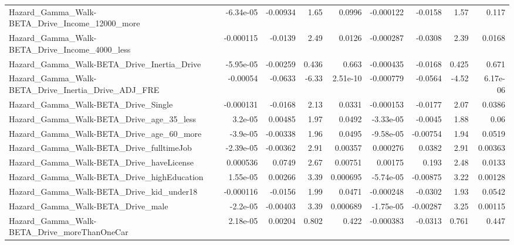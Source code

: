 \begin{tabular}{lrrrrrrrr}
Hazard\_Gamma\_Walk-BETA\_Drive\_Income\_12000\_more     &   -6.34e-05 &     -0.00934 &     1.65 &   0.0996 &  -0.000122 &     -0.0158 &         1.57 &         0.117 \\
Hazard\_Gamma\_Walk-BETA\_Drive\_Income\_4000\_less      &   -0.000115 &      -0.0139 &     2.49 &   0.0126 &  -0.000287 &     -0.0308 &         2.39 &        0.0168 \\
Hazard\_Gamma\_Walk-BETA\_Drive\_Inertia\_Drive         &   -5.95e-05 &     -0.00259 &    0.436 &    0.663 &  -0.000435 &     -0.0168 &        0.425 &         0.671 \\
Hazard\_Gamma\_Walk-BETA\_Drive\_Inertia\_Drive\_ADJ\_FRE &    -0.00054 &      -0.0633 &    -6.33 & 2.51e-10 &  -0.000779 &     -0.0564 &        -4.52 &      6.17e-06 \\
Hazard\_Gamma\_Walk-BETA\_Drive\_Single                &   -0.000131 &      -0.0168 &     2.13 &   0.0331 &  -0.000153 &     -0.0177 &         2.07 &        0.0386 \\
Hazard\_Gamma\_Walk-BETA\_Drive\_age\_35\_less           &     3.2e-05 &      0.00485 &     1.97 &   0.0492 &  -3.33e-05 &     -0.0045 &         1.88 &          0.06 \\
Hazard\_Gamma\_Walk-BETA\_Drive\_age\_60\_more           &    -3.9e-05 &     -0.00338 &     1.96 &   0.0495 &  -9.58e-05 &    -0.00754 &         1.94 &        0.0519 \\
Hazard\_Gamma\_Walk-BETA\_Drive\_fulltimeJob           &   -2.39e-05 &     -0.00362 &     2.91 &  0.00357 &   0.000276 &      0.0382 &         2.91 &       0.00363 \\
Hazard\_Gamma\_Walk-BETA\_Drive\_haveLicense           &    0.000536 &       0.0749 &     2.67 &  0.00751 &    0.00175 &       0.193 &         2.48 &        0.0133 \\
Hazard\_Gamma\_Walk-BETA\_Drive\_highEducation         &    1.55e-05 &      0.00266 &     3.39 & 0.000695 &  -5.74e-05 &    -0.00875 &         3.22 &       0.00128 \\
Hazard\_Gamma\_Walk-BETA\_Drive\_kid\_under18           &   -0.000116 &      -0.0156 &     1.99 &   0.0471 &  -0.000248 &     -0.0302 &         1.93 &        0.0542 \\
Hazard\_Gamma\_Walk-BETA\_Drive\_male                  &    -2.2e-05 &     -0.00403 &     3.39 & 0.000689 &  -1.75e-05 &    -0.00287 &         3.25 &       0.00115 \\
Hazard\_Gamma\_Walk-BETA\_Drive\_moreThanOneCar        &    2.18e-05 &      0.00204 &    0.802 &    0.422 &  -0.000383 &     -0.0313 &        0.761 &         0.447 \\

\end{tabular}
